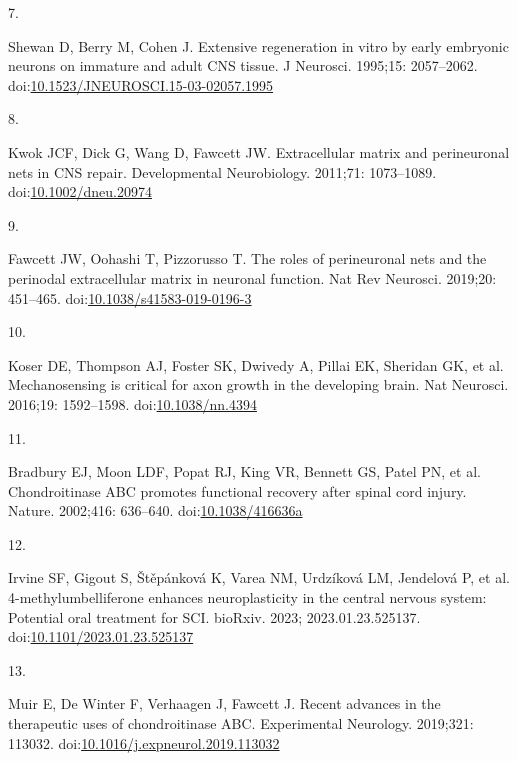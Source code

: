 \documentclass[
  12pt,
  a4paper,
]{book}
\newlength{\cslhangindent}
\newlength{\csllabelwidth}
\newenvironment{CSLReferences}[2] %
 {\begin{list}{}{%
  \setlength{\itemindent}{0pt}
  \setlength{\leftmargin}{0pt}
  \setlength{\parsep}{0pt}
  \ifodd #1
   \setlength{\leftmargin}{\cslhangindent}
   \setlength{\itemindent}{-1\cslhangindent}
  \fi
  \setlength{\itemsep}{#2\baselineskip}}}
 {\end{list}}
\newcommand{\CSLLeftMargin}[1]{\parbox[t]{\csllabelwidth}{\strut#1\strut}}
\newcommand{\CSLRightInline}[1]{\parbox[t]{\linewidth - \csllabelwidth}{\strut#1\strut}}
\begin{document}
\begin{CSLReferences}{0}{1}
\CSLLeftMargin{7. }%
\CSLRightInline{Shewan D, Berry M, Cohen J. Extensive regeneration in vitro by early embryonic neurons on immature and adult {CNS} tissue. J Neurosci. 1995;15: 2057--2062. doi:\href{https://doi.org/10.1523/JNEUROSCI.15-03-02057.1995}{10.1523/JNEUROSCI.15-03-02057.1995}}

\CSLLeftMargin{8. }%
\CSLRightInline{Kwok JCF, Dick G, Wang D, Fawcett JW. Extracellular matrix and perineuronal nets in {CNS} repair. Developmental Neurobiology. 2011;71: 1073--1089. doi:\href{https://doi.org/10.1002/dneu.20974}{10.1002/dneu.20974}}

\CSLLeftMargin{9. }%
\CSLRightInline{Fawcett JW, Oohashi T, Pizzorusso T. The roles of perineuronal nets and the perinodal extracellular matrix in neuronal function. Nat Rev Neurosci. 2019;20: 451--465. doi:\href{https://doi.org/10.1038/s41583-019-0196-3}{10.1038/s41583-019-0196-3}}

\CSLLeftMargin{10. }%
\CSLRightInline{Koser DE, Thompson AJ, Foster SK, Dwivedy A, Pillai EK, Sheridan GK, et al. Mechanosensing is critical for axon growth in the developing brain. Nat Neurosci. 2016;19: 1592--1598. doi:\href{https://doi.org/10.1038/nn.4394}{10.1038/nn.4394}}

\CSLLeftMargin{11. }%
\CSLRightInline{Bradbury EJ, Moon LDF, Popat RJ, King VR, Bennett GS, Patel PN, et al. Chondroitinase {ABC} promotes functional recovery after spinal cord injury. Nature. 2002;416: 636--640. doi:\href{https://doi.org/10.1038/416636a}{10.1038/416636a}}

\CSLLeftMargin{12. }%
\CSLRightInline{Irvine SF, Gigout S, Štěpánková K, Varea NM, Urdzíková LM, Jendelová P, et al. 4-methylumbelliferone enhances neuroplasticity in the central nervous system: Potential oral treatment for {SCI}. bioRxiv. 2023; 2023.01.23.525137. doi:\href{https://doi.org/10.1101/2023.01.23.525137}{10.1101/2023.01.23.525137}}

\CSLLeftMargin{13. }%
\CSLRightInline{Muir E, De Winter F, Verhaagen J, Fawcett J. Recent advances in the therapeutic uses of chondroitinase {ABC}. Experimental Neurology. 2019;321: 113032. doi:\href{https://doi.org/10.1016/j.expneurol.2019.113032}{10.1016/j.expneurol.2019.113032}}


\end{CSLReferences}
\end{document}
